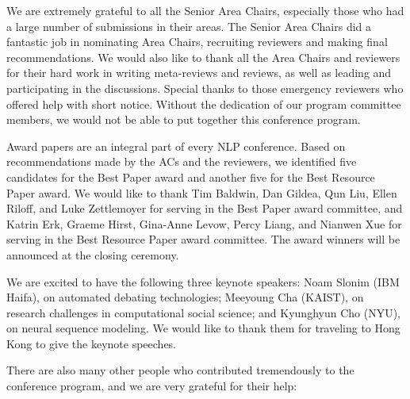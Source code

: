 We are extremely grateful to all the Senior Area Chairs, especially those who had a large number of submissions in their areas. The Senior Area Chairs did a fantastic job in nominating Area Chairs, recruiting reviewers and making final recommendations. We would also like to thank all the Area Chairs and reviewers for their hard work in writing meta-reviews and reviews, as well as leading and participating in the discussions. Special thanks to those emergency reviewers who offered help with short notice. Without the dedication of our program committee members, we would not be able to put together this conference program.

Award papers are an integral part of every NLP conference. Based on recommendations made by the ACs and the reviewers, we identified five candidates for the Best Paper award and another five for the Best Resource Paper award. We would like to thank Tim Baldwin, Dan Gildea, Qun Liu, Ellen Riloff, and Luke Zettlemoyer for serving in the Best Paper award committee, and Katrin Erk, Graeme Hirst, Gina-Anne Levow, Percy Liang, and Nianwen Xue for serving in the Best Resource Paper award committee. The award winners will be announced at the closing ceremony.

We are excited to have the following three keynote speakers: Noam Slonim (IBM Haifa), on automated debating technologies; Meeyoung Cha (KAIST), on research challenges in computational social science; and Kyunghyun Cho (NYU), on neural sequence modeling. We would like to thank them for traveling to Hong Kong to give the keynote speeches.

There are also many other people who contributed tremendously to the conference program, and we are very grateful for their help:

